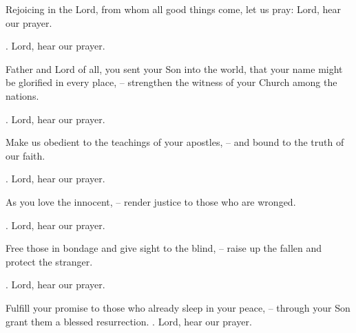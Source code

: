 \lettrine[loversize=0.15,lines=2]{R}{}ejoicing in the Lord, from whom all good things come, let us pray: Lord, hear our prayer.
\par \Rbar. Lord, hear our prayer.

Father and Lord of all, you sent your Son into the world, that your name might be glorified in every place,
– strengthen the witness of your Church among the nations.
\par \Rbar. Lord, hear our prayer.

Make us obedient to the teachings of your apostles,
– and bound to the truth of our faith.
\par \Rbar. Lord, hear our prayer.

As you love the innocent,
– render justice to those who are wronged.
\par \Rbar. Lord, hear our prayer.

Free those in bondage and give sight to the blind,
– raise up the fallen and protect the stranger.
\par \Rbar. Lord, hear our prayer.

Fulfill your promise to those who already sleep in your peace,
– through your Son grant them a blessed resurrection.
\Rbar. Lord, hear our prayer.
